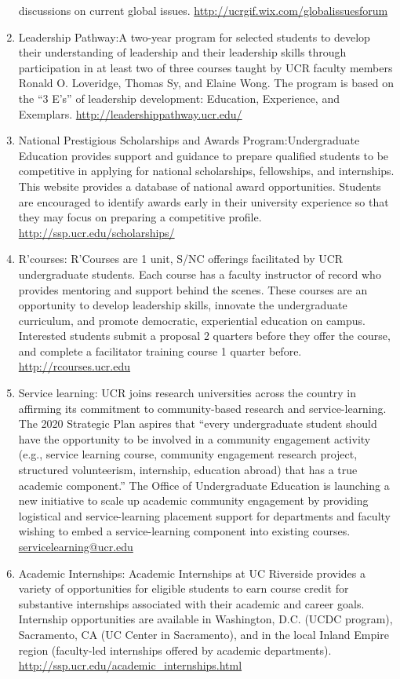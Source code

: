 \documentclass[12pt]{article}
\begin{document}
\begin{enumerate}
  discussions on current global
  issues. \url{http://ucrgif.wix.com/globalissuesforum}
\item Leadership Pathway:A two-year program for selected students to
  develop their understanding of leadership and their leadership
  skills through participation in at least two of three courses taught
  by UCR faculty members Ronald O. Loveridge, Thomas Sy, and Elaine
  Wong. The program is based on the “3 E’s” of leadership development:
  Education, Experience, and
  Exemplars. \url{http://leadershippathway.ucr.edu/ }
\item National Prestigious Scholarships and Awards
  Program:Undergraduate Education provides support and guidance to
  prepare qualified students to be competitive in applying for
  national scholarships, fellowships, and internships. This website
  provides a database of national award opportunities. Students are
  encouraged to identify awards early in their university experience
  so that they may focus on preparing a competitive
  profile. \url{http://ssp.ucr.edu/scholarships/ }
\item R'courses: R’Courses are 1 unit, S/NC offerings facilitated by
  UCR undergraduate students. Each course has a faculty instructor of
  record who provides mentoring and support behind the scenes. These
  courses are an opportunity to develop leadership skills, innovate
  the undergraduate curriculum, and promote democratic, experiential
  education on campus. Interested students submit a proposal 2
  quarters before they offer the course, and complete a facilitator
  training course 1 quarter before. \url{http://rcourses.ucr.edu}
\item Service learning: UCR joins research universities across the
  country in affirming its commitment to community-based research and
  service-learning.  The 2020 Strategic Plan aspires that “every
  undergraduate student should have the opportunity to be involved in
  a community engagement activity (e.g., service learning course,
  community engagement research project, structured volunteerism,
  internship, education abroad) that has a true academic component.”
  The Office of Undergraduate Education is launching a new initiative
  to scale up academic community engagement by providing logistical
  and service-learning placement support for departments and faculty
  wishing to embed a service-learning component into existing
  courses. \url{servicelearning@ucr.edu}
\item Academic Internships: Academic Internships at UC Riverside
  provides a variety of opportunities for eligible students to earn
  course credit for substantive internships associated with their
  academic and career goals.  Internship opportunities are available
  in Washington, D.C. (UCDC program), Sacramento, CA (UC Center in
  Sacramento), and in the local Inland Empire region (faculty-led
  internships offered by academic
  departments). \url{http://ssp.ucr.edu/academic_internships.html}


\end{enumerate}
\end{document}
